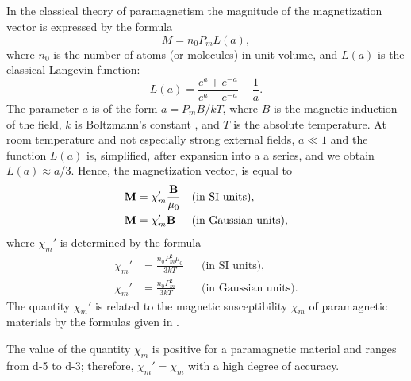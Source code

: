 \subsection{}\label{26.3.7} In the classical theory of paramagnetism the magnitude of the magnetization vector  is expressed by the formula
\begin{equation*}%
M= n_{0} P_{m} L(a),
\end{equation*}
where $n_{0}$ is the number of atoms (or molecules) in unit volume, and $L (a)$ is the classical Langevin function:
\begin{equation*}%
L(a) = \frac{e^{a} + e^{-a}}{e^{a}-e^{-a}} - \frac{1}{a}.
\end{equation*}
The parameter $a$ is of the form $a = P_{m}B/kT$, where $B$ is the magnetic induction of the field, $k$ is Boltzmann's constant , and $T$ is the absolute temperature. At room temperature and not especially strong external fields, $a \ll 1$ and the function $L (a)$ is, simplified, after expansion into a a series, and we obtain $L (a) \approx a/3$. Hence, the magnetization vector, is equal to
\begin{align*}%
\vb{M} & = \chi_{m}' \frac{\vb{B}}{\mu_{0}} && \text{(in SI units),} \\
\vb{M} & = \chi_{m}' \vb{B} && \text{(in Gaussian units)},
\end{align*}
where $\chi_{m}'$ is determined by the formula
\begin{align*}%
\chi_{m}' & =  \frac{n_{0}P_{m}^{2}\mu_{0}}{3kT} && \text{(in SI units),} \\
\chi_{m}' & =  \frac{n_{0}P_{m}^{2}}{3kT} && \text{(in Gaussian units)}.
\end{align*}
The quantity $\chi_{m}'$ is related to the magnetic susceptibility $\chi_{m}$ of paramagnetic materials by the formulas given in .

The value of the quantity $\chi_{m}$ is positive for a paramagnetic
material and ranges from \num{d-5} to \num{d-3}; therefore, $\chi_{m}' = \chi_{m}$ with a high degree of accuracy.

